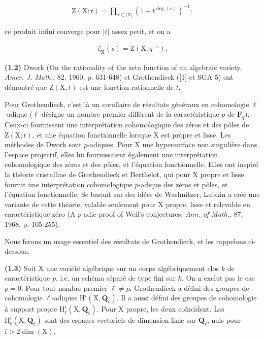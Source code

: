 \documentclass[10pt,leqno]{article}
\begin{document}
\begin{equation*}\begin{gathered}\mathrm{Z}(\mathrm{X}; t) = \prod _{x\in |\mathrm{X}|} (1 -  t^{\operatorname{deg}(x)})^{- 1} ;\end{gathered}\tag{1.1.2}\end{equation*}

\noindent ce produit infini converge pour |\(t|\) assez petit, et on a\par

\begin{equation*}\begin{gathered}\zeta _{\mathrm{X}}(s) = \mathrm{Z}(\mathrm{X}; q^{- s}).\end{gathered}\tag{1.1.3}\end{equation*}

\noindent \textbf{(1.2)} Dwork (On the rationality of the zeta function of an algebraic variety, \emph{Amer. J. Math.}, 82, 1960, p. 631-648) et Grothendieck ([1] et SGA 5) ont démontré que \(\mathrm{Z}(\mathrm{X}, t)\) est une fonction rationnelle de \(t\).\par

\noindent Pour Grothendieck, c’est là un corollaire de résultats généraux en cohomologie \(\ell \)-adique (\(\ell \) désigne un nombre premier différent de la caractéristique \(p\) de \(\mathbf{F}_{q})\). Ceux-ci fournissent une interprétation cohomologique des zéros et des pôles de \(\mathrm{Z}(\mathrm{X}; t)\), et une équation fonctionnelle lorsque \(\mathrm{X}\) est propre et lisse. Les méthodes de Dwork sont \(p\)-adiques. Pour \(\mathrm{X}\) une hypersurface non singulière dans l’espace projectif, elles lui fournissaient également une interprétation cohomologique des zéros et des pôles, et l’équation fonctionnelle. Elles ont inspiré la théorie cristalline de Grothendieck et Berthelot, qui pour \(\mathrm{X}\) propre et lisse fournit une interprétation cohomologique \(p\)-adique des zéros et pôles, et l’équation fonctionnelle. Se basant sur des idées de Washnitzer, Lubkin a créé une variante de cette théorie, valable seulement pour \(\mathrm{X}\) propre, lisse et relevable en caractéristique zéro (A \(p\)-adic proof of Weil’s conjectures, \emph{Ann. of Math.}, 87, 1968, p. 105-255).\par

\noindent Nous ferons un usage essentiel des résultats de Grothendieck, et les rappelons ci-dessous.\par

\noindent \textbf{(1.3)} Soit \(\mathrm{X}\) une variété algébrique sur un corps algébriquement clos \(k\) de caractéristique \(p\), i.e. un schéma séparé de type fini sur \(k\). On n’exclut pas le cas \(p=0\). Pour tout nombre premier \(\ell \ne p\), Grothendieck a défini des groupes de cohomologie \(\ell \)-adiques \(\mathrm{H}^{i}(\mathrm{X}, \mathbf{Q}_{\ell })\). Il a aussi défini des groupes de cohomologie à support propre \(\mathrm{H}_{c}^{i}(\mathrm{X}, \mathbf{Q}_{\ell })\). Pour \(\mathrm{X}\) propre, les deux coïncident. Les \(\mathrm{H}_{c}^{i}(\mathrm{X}, \mathbf{Q}_{\ell })\) sont des espaces vectoriels de dimension finie sur \(\mathbf{Q}_{\ell }\), nuls pour \(i>2 \operatorname{dim}(\mathrm{X})\).\par
\end{document}
